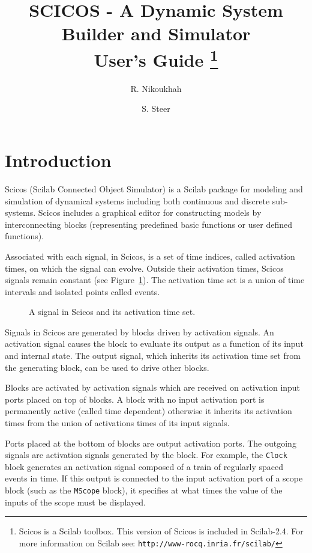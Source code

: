 \documentclass{article}
\title{SCICOS - A Dynamic System Builder and Simulator\\ User's Guide \thanks{Scicos is a Scilab
toolbox. This version of Scicos is included in Scilab-2.4. For more information on Scilab see:
{\tt http://www-rocq.inria.fr/scilab/}}}
\author{R. Nikoukhah \and S. Steer}
\date{}
\begin{document}
\maketitle

\section{Introduction}
\label{scicos}
Scicos (Scilab Connected Object Simulator) is a Scilab package for
modeling and simulation of dynamical systems including
both continuous and discrete sub-systems.
Scicos includes a graphical editor for constructing 
models by interconnecting blocks (representing predefined basic
functions or user defined functions). 

Associated with each signal, in Scicos, is a set of time indices, called activation times,
on which the signal can evolve. Outside their activation times, Scicos signals remain constant (see
Figure~\ref{ghuio}). The activation time set is a union of time intervals and isolated
points called events.
\begin{figure}
\begin{center}

\end{center}
\caption{A signal in Scicos  and its activation time set.}
\label{ghuio}
\end{figure}

Signals in Scicos are generated by blocks driven by activation signals. An activation
signal causes the block to evaluate its output as a function of its input and internal state. 
The output signal, which inherits its activation time set from the generating block, can be
used to drive other blocks. 

Blocks are activated by activation signals which are received on activation input
ports placed on top of blocks. A block with no input activation port is 
permanently active (called time dependent) otherwise it inherits its activation
times from the union of activations times of its input signals.

Ports placed at the bottom of blocks are output activation ports. The outgoing
signals are activation signals generated by the block. For example,
the {\tt Clock} block generates an activation signal composed of a train of
regularly spaced events in time. If this output is connected to the input
activation port of a scope block (such as the {\tt MScope} block), it specifies
at what times the value of the inputs of the scope must be displayed.
\end{document}
